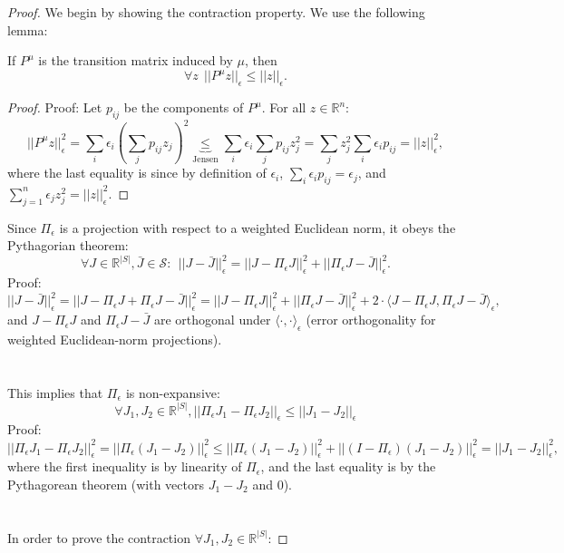 \begin{proof}
We begin by showing the contraction property. We use the following lemma:
\begin{lemma}\label{lem:P_non_expansion} If $P^\mu$ is the transition matrix induced by $\mu$, then
$$\forall z \ \ ||P^\mu z||_\epsilon \le ||z||_\epsilon.$$
\end{lemma}
\begin{proof}
Proof: Let $p_{ij}$ be the components of $P^\mu$. For all $z \in \mathbb{R}^n$:
$$||P^\mu z||_\epsilon^2 = \sum_i \epsilon_i\left(\sum_j p_{ij}z_j\right)^2 \underbrace{\leq}_{\textrm{Jensen}} \sum_i \epsilon_i \sum_j p_{ij} z_j^2 =  \sum_j z_j^2 \sum_i\epsilon_i p_{ij} = ||z||_\epsilon^2,$$
where the last equality is since by definition of $\epsilon_i$, $\sum_i\epsilon_i p_{ij}  =\epsilon_j$, and
$\sum_{j=1}^n\epsilon_j z_j^2 = ||z||_\epsilon^2.$
\end{proof}
Since $\Pi_\epsilon$ is a projection with respect to a weighted Euclidean norm, it obeys the Pythagorian theorem:
$$\forall J\in \mathbb{R}^{|S|}, \bar{J}\in \mathcal{S}: \ \ ||J-\bar{J}||_\epsilon^2 = ||J-\Pi_\epsilon J||_\epsilon^2 + ||\Pi_\epsilon J - \bar{J}||_\epsilon^2.$$
Proof:
$$||J-\bar{J}||_\epsilon^2 = ||J-\Pi_\epsilon J + \Pi_\epsilon J - \bar{J}||_\epsilon^2 = ||J-\Pi_\epsilon J||_\epsilon^2 + ||\Pi_\epsilon J - \bar{J}||_\epsilon^2 + 2 \cdot \langle J-\Pi_\epsilon J, \Pi_\epsilon J - \bar{J}\rangle_\epsilon,$$
and $J-\Pi_\epsilon J$ and $\Pi_\epsilon J-\bar{J}$ are orthogonal under $\langle\cdot,\cdot\rangle_\epsilon$ (error orthogonality for weighted Euclidean-norm projections).
\\
\\
\\
This implies that $\Pi_\epsilon$ is non-expansive:
$$\forall {J}_1,{J}_2\in \mathbb{R}^{|S|}, ||\Pi_\epsilon {J}_1 - \Pi_\epsilon {J}_2||_\epsilon \le ||{J}_1-{J}_2||_\epsilon$$
Proof:
$$||\Pi_\epsilon {J}_1 - \Pi_\epsilon {J}_2||_\epsilon^2 = ||\Pi_\epsilon({J}_1-{J}_2)||_\epsilon^2 \le ||\Pi_\epsilon({J}_1-{J}_2)||_\epsilon^2 + ||(I-\Pi_\epsilon)({J}_1-{J}_2)||_\epsilon^2 = ||{J}_1-{J}_2||_\epsilon^2,$$
where the first inequality is by linearity of $\Pi_\epsilon$, and the last equality is by the Pythagorean theorem (with vectors ${J}_1-{J}_2$ and $0$).
\\
\\
\\
In order to prove the contraction $\forall {J}_1,{J}_2\in \mathbb{R}^{|S|}$:

\end{proof}
